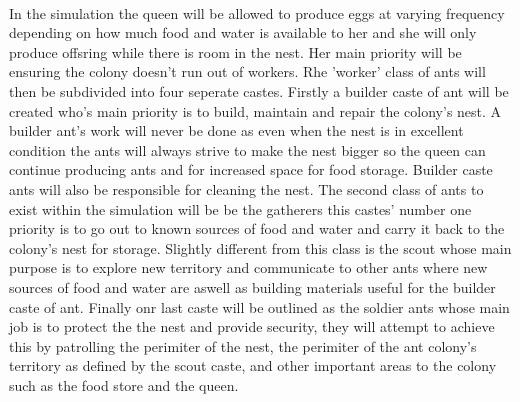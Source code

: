 \documentclass{report}
\begin{document}
\paragraph{}In the simulation the queen will be allowed to produce eggs at varying frequency depending on how much food and water is available to her and she will only produce offsring while there is room in the nest. Her main priority will be ensuring the colony doesn't run out of workers. Rhe 'worker' class of ants will then be subdivided into four seperate castes. Firstly a builder caste of ant will be created who's main priority is to build, maintain and repair the colony's nest. A builder ant's work will never be done as even when the nest is in excellent condition the ants will always strive to make the nest bigger so the queen can continue producing ants and for increased space for food storage. Builder caste ants will also be responsible for cleaning the nest. The second class of ants to exist within the simulation will be be the gatherers this castes' number one priority is to go out to known sources of food and water and carry it back to the colony's nest for storage. Slightly different from this class is the scout whose main purpose is to explore new territory and communicate to other ants where new sources of food and water are aswell as building materials useful for the builder caste of ant. Finally onr last caste will be outlined as the soldier ants whose main job is to protect the the nest and provide security, they will attempt to achieve this by patrolling the perimiter of the nest, the perimiter of the ant colony's territory as defined by the scout caste, and other important areas to the colony such as the food store and the queen.
\end{document}
